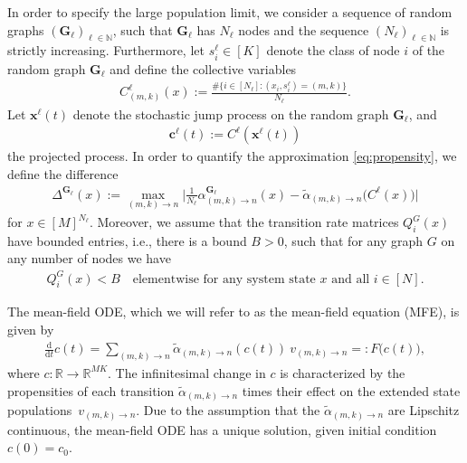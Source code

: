 \documentclass[a4paper,
               10pt,
               pdftex,
               normalheadings,
               headsepline,
               footsepline,
               headinclude,
               footinclude,
               DIV=14,
               abstracton]
{scrartcl}
\newcommand{\R}{\mathbb{R}}
\newcommand{\rv}[1]{\bm{#1}}
\newcommand{\diff}{\mathrm{d}}
\begin{document}
In order to specify the large population limit, we consider a sequence of random graphs $(\rv{G}_\ell)_{\ell \in \mathbb{N}}$, such that $\rv{G}_\ell$ has $N_\ell$ nodes and the sequence $(N_\ell)_{\ell \in \mathbb{N}}$ is strictly increasing.
Furthermore, let $s_i^\ell \in [K]$ denote the class of node $i$ of the random graph $\rv{G}_\ell$ and define the collective variables
\begin{align}
    C^\ell_{(m, k)}(x) := \frac{\# \{i \in [N_\ell]: (x_i, s^\ell_i) = (m, k) \}}{N_\ell}.
\end{align}
Let $\rv{x}^\ell(t)$ denote the stochastic jump process on the random graph $\rv{G}_\ell$, and
\begin{align}
    \rv{c}^\ell(t) := C^{\ell}(\rv{x}^\ell(t))
    \label{eq:definition_c}
\end{align}
the projected process.
In order to quantify the approximation \eqref{eq:propensity}, we define the difference
\begin{align}\label{Delta}
    \Delta^{\rv{G}_\ell}(x) := \max_{(m,k)\to n} \Big\lvert \frac{1}{N_\ell} \alpha_{(m,k)\to n}^{\rv{G}_\ell}(x) - \tilde{\alpha}_{(m,k)\to n}\big( C^\ell(x) \big) \Big\rvert
\end{align}
for $x \in [M]^{N_\ell}$.
Moreover, we assume that the transition rate matrices $Q_i^{G}(x)$ have bounded entries, i.e., there is a bound $B > 0$, such that for any graph $G$ on any number of nodes we have
\begin{align}
    Q_i^{G}(x) < B \quad \text{elementwise for any system state $x$ and all $i\in [N]$.}
    \label{eq:Q_bound_B}
\end{align}

The mean-field ODE, which we will refer to as the mean-field equation (MFE), is given by
\begin{align}
    \frac{\diff}{\diff t} c(t) = \sum_{(m,k)\to n} \tilde{\alpha}_{(m,k)\to n}(c(t))\ v_{(m,k)\to n} =: F\big(c(t)\big),
    \label{eq:MFE}
\end{align}
where $c:\R \to \R^{MK}$.
The infinitesimal change in $c$ is characterized by the propensities of each transition $\tilde{\alpha}_{(m,k)\to n}$ times their effect on the extended state populations~$v_{(m,k)\to n}$.
Due to the assumption that the $\tilde{\alpha}_{(m,k)\to n}$ are Lipschitz continuous, the mean-field ODE has a unique solution, given initial condition~$c(0) = c_0$.
\end{document}
